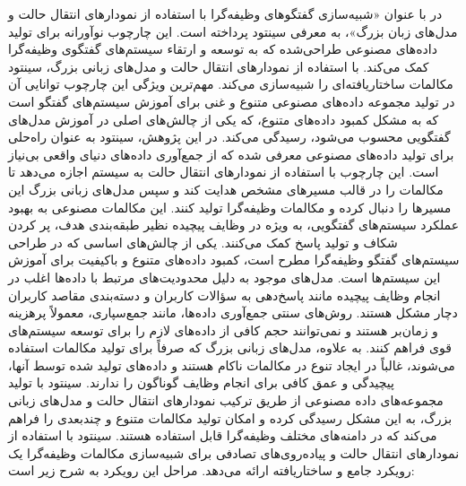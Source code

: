 \begin{enumerate}
در %
\cite{samarinas2024simulating}
با عنوان «شبیه‌سازی گفتگوهای وظیفه‌گرا با استفاده از نمودارهای انتقال حالت و مدل‌های زبان بزرگ»، به معرفی 
سینتود%
 پرداخته است. این چارچوب نوآورانه برای تولید داده‌های مصنوعی طراحی‌شده که به توسعه و ارتقاء سیستم‌های گفتگوی وظیفه‌گرا کمک می‌کند. با استفاده از نمودارهای 
انتقال حالت%
 و مدل‌های زبانی بزرگ، سینتود مکالمات ساختاریافته‌ای را شبیه‌سازی می‌کند. مهم‌ترین ویژگی این چارچوب توانایی آن در تولید مجموعه داده‌های مصنوعی متنوع و غنی برای آموزش سیستم‌های گفتگو است که به مشکل کمبود داده‌های متنوع، که یکی از چالش‌های اصلی در آموزش مدل‌های گفتگویی محسوب می‌شود، رسیدگی می‌کند.
در این پژوهش، سینتود به عنوان راه‌حلی برای تولید داده‌های مصنوعی معرفی شده که از جمع‌آوری داده‌های دنیای واقعی بی‌نیاز است. این چارچوب با استفاده از نمودارهای انتقال حالت به سیستم اجازه می‌دهد تا مکالمات را در قالب مسیرهای مشخص هدایت کند و سپس مدل‌های زبانی بزرگ این مسیرها را دنبال کرده و مکالمات وظیفه‌گرا تولید کنند. این مکالمات مصنوعی به بهبود عملکرد سیستم‌های گفتگویی، به ویژه در وظایف پیچیده نظیر طبقه‌بندی هدف، پر کردن شکاف و تولید پاسخ کمک می‌کنند.
\newline
یکی از چالش‌های اساسی که در طراحی سیستم‌های گفتگو وظیفه‌گرا مطرح است، کمبود داده‌های متنوع و باکیفیت برای آموزش این سیستم‌ها است. مدل‌های موجود به دلیل محدودیت‌های مرتبط با داده‌ها اغلب در انجام وظایف پیچیده مانند پاسخ‌دهی به سؤالات کاربران و دسته‌بندی مقاصد کاربران دچار مشکل هستند. روش‌های سنتی جمع‌آوری داده‌ها، مانند جمع‌سپاری، معمولاً پرهزینه و زمان‌بر هستند و نمی‌توانند حجم کافی از داده‌های لازم را برای توسعه سیستم‌های قوی فراهم کنند.
به علاوه، مدل‌های زبانی بزرگ که صرفاً برای تولید مکالمات استفاده می‌شوند، غالباً در ایجاد تنوع در مکالمات ناکام هستند و داده‌های تولید شده توسط آنها، پیچیدگی و عمق کافی برای انجام وظایف گوناگون را ندارند. سینتود با تولید مجموعه‌های داده مصنوعی از طریق ترکیب نمودارهای انتقال حالت و مدل‌های زبانی بزرگ، به این مشکل رسیدگی کرده و امکان تولید مکالمات متنوع و چندبعدی را فراهم می‌کند که در دامنه‌های مختلف وظیفه‌گرا قابل استفاده هستند.
\newline
سینتود با استفاده از نمودارهای انتقال حالت و 
پیاده‌روی‌های تصادفی%
 برای شبیه‌سازی مکالمات وظیفه‌گرا یک رویکرد جامع و ساختاریافته ارائه می‌دهد. 
مراحل این رویکرد به شرح زیر است:


\end{enumerate}
